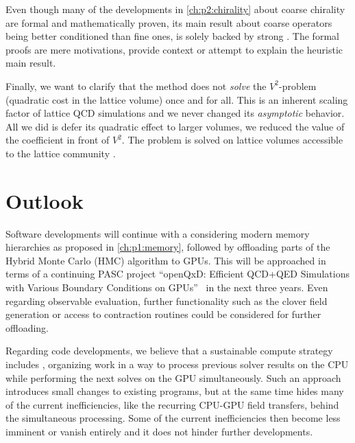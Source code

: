 Even though many of the developments in \cref{ch:p2:chirality} about coarse chirality are formal and mathematically proven, its main result about coarse operators being better conditioned than fine ones, is solely backed by strong .
The formal proofs are mere motivations, provide context or attempt to explain the heuristic main result.

Finally, we want to clarify that the method does not \emph{solve} the $V^{2}$-problem (quadratic cost in the lattice volume) once and for all.
This is an inherent scaling factor of lattice QCD simulations and we never changed its \emph{asymptotic} behavior.
All we did is defer its quadratic effect to larger volumes, \ie we reduced the value of the coefficient in front of $V^{2}$.
The problem is solved on lattice volumes accessible to the lattice community .

\section{Outlook}

Software developments will continue with a  considering modern memory hierarchies as proposed in \cref{ch:p1:memory}, followed by offloading parts of the Hybrid Monte Carlo (HMC) algorithm to GPUs.
This will be approached in terms of a continuing PASC project ``openQxD: Efficient QCD+QED Simulations with Various Boundary Conditions on GPUs''~\cite{online:pasc2025} in the next three years.
Even regarding observable evaluation, further functionality such as the  clover field generation or access to \qudas contraction routines could be considered for further offloading.

Regarding code developments, we believe that a sustainable compute strategy includes , organizing work in a way to process previous solver results on the CPU while performing the next solves on the GPU simultaneously.
Such an approach introduces small changes to existing programs, but at the same time hides many of the current inefficiencies, like the recurring CPU-GPU field transfers, behind the simultaneous processing.
Some of the current inefficiencies then become less imminent or vanish entirely and it does not hinder further developments.


